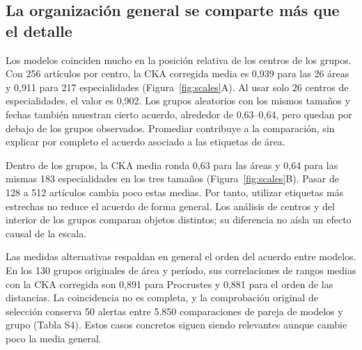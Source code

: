 \subsection{La organización general se comparte más que el detalle}
Los modelos coinciden mucho en la posición relativa de los centros de los grupos. Con 256 artículos por centro, la CKA corregida media es 0,939 para las 26 áreas y 0,911 para 217 especialidades (Figura~\ref{fig:scales}A). Al usar solo 26 centros de especialidades, el valor es 0,902. Los grupos aleatorios con los mismos tamaños y fechas también muestran cierto acuerdo, alrededor de 0,63--0,64, pero quedan por debajo de los grupos observados. Promediar contribuye a la comparación, sin explicar por completo el acuerdo asociado a las etiquetas de área.

Dentro de los grupos, la CKA media ronda 0,63 para las áreas y 0,64 para las mismas 183 especialidades en los tres tamaños (Figura~\ref{fig:scales}B). Pasar de 128 a 512 artículos cambia poco estas medias. Por tanto, utilizar etiquetas más estrechas no reduce el acuerdo de forma general. Los análisis de centros y del interior de los grupos comparan objetos distintos; su diferencia no aísla un efecto causal de la escala.

Las medidas alternativas respaldan en general el orden del acuerdo entre modelos. En los 130 grupos originales de área y período, sus correlaciones de rangos medias con la CKA corregida son 0,891 para Procrustes y 0,881 para el orden de las distancias. La coincidencia no es completa, y la comprobación original de selección conserva 50 alertas entre 5.850 comparaciones de pareja de modelos y grupo (Tabla S4). Estos casos concretos siguen siendo relevantes aunque cambie poco la media general.


